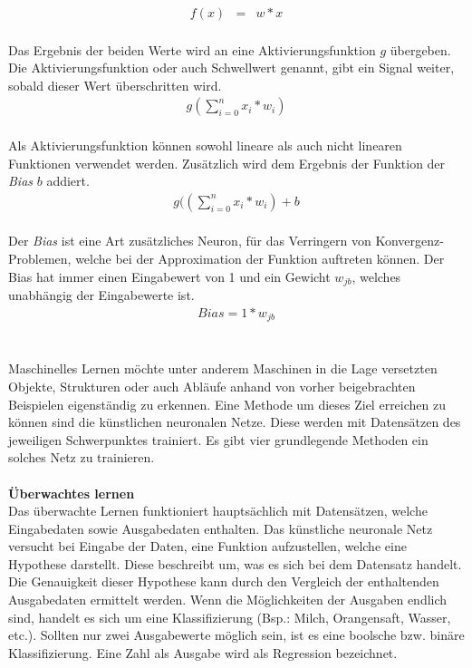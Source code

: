 \documentclass[a4paper,12pt,oneside]{article}
\begin{document}
\begin{eqnarray} f(x) & = & w*x \end{eqnarray}\\
Das Ergebnis der beiden Werte wird an eine Aktivierungsfunktion $g$ übergeben. Die Aktivierungsfunktion oder auch Schwellwert genannt, gibt ein Signal weiter, sobald dieser Wert überschritten wird.\\
\begin{eqnarray} g( \sum_{i=0}^n x_{i} *w_{i}) \end{eqnarray}\\
Als Aktivierungsfunktion können sowohl lineare als auch nicht linearen Funktionen verwendet werden. Zusätzlich wird dem Ergebnis der Funktion der \textit{Bias} $b$ addiert.\\
\begin{eqnarray} g(( \sum_{i=0}^n x_{i} *w_{i}) +b \end{eqnarray}\\
Der \textit{Bias} ist eine Art zusätzliches Neuron, für das Verringern von Konvergenz-Problemen, welche bei der Approximation der Funktion auftreten können. Der Bias hat immer einen Eingabewert von 1 und ein Gewicht $w_{jb}$, welches unabhängig der Eingabewerte ist.\\
\begin{eqnarray} Bias = 1*w_{jb} \end{eqnarray}\\\\
Maschinelles Lernen möchte unter anderem Maschinen in die Lage versetzten Objekte, Strukturen oder auch Abläufe anhand von vorher beigebrachten Beispielen eigenständig zu erkennen. Eine Methode um dieses Ziel erreichen zu können sind die künstlichen neuronalen Netze. Diese werden mit Datensätzen des jeweiligen Schwerpunktes trainiert. Es gibt vier grundlegende Methoden ein solches Netz zu trainieren.\\\\
\textbf{Überwachtes lernen}\\
Das überwachte Lernen funktioniert hauptsächlich mit Datensätzen, welche Eingabedaten sowie Ausgabedaten enthalten. Das künstliche neuronale Netz versucht bei Eingabe der Daten, eine Funktion aufzustellen, welche eine Hypothese darstellt. Diese beschreibt um, was es sich bei dem Datensatz handelt. Die Genauigkeit dieser Hypothese kann durch den Vergleich der enthaltenden Ausgabedaten ermittelt werden. Wenn die Möglichkeiten der Ausgaben endlich sind, handelt es sich um eine Klassifizierung (Bsp.: Milch, Orangensaft, Wasser, etc.). Sollten nur zwei Ausgabewerte möglich sein, ist es eine boolsche bzw. binäre Klassifizierung. Eine Zahl als Ausgabe wird als Regression bezeichnet.\\\\
\end{document}
